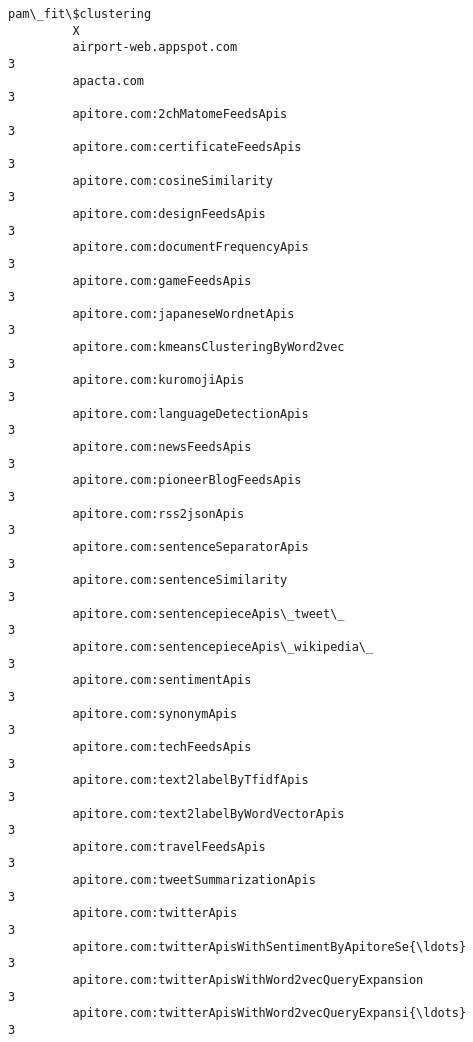 \documentclass[11pt]{article}
\begin{document}
\begin{Verbatim}[commandchars=\\\{\}]
                                                             pam\_fit\$clustering  
         X                                                                       
         airport-web.appspot.com                                              3  
         apacta.com                                                           3  
         apitore.com:2chMatomeFeedsApis                                       3  
         apitore.com:certificateFeedsApis                                     3  
         apitore.com:cosineSimilarity                                         3  
         apitore.com:designFeedsApis                                          3  
         apitore.com:documentFrequencyApis                                    3  
         apitore.com:gameFeedsApis                                            3  
         apitore.com:japaneseWordnetApis                                      3  
         apitore.com:kmeansClusteringByWord2vec                               3  
         apitore.com:kuromojiApis                                             3  
         apitore.com:languageDetectionApis                                    3  
         apitore.com:newsFeedsApis                                            3  
         apitore.com:pioneerBlogFeedsApis                                     3  
         apitore.com:rss2jsonApis                                             3  
         apitore.com:sentenceSeparatorApis                                    3  
         apitore.com:sentenceSimilarity                                       3  
         apitore.com:sentencepieceApis\_tweet\_                                 3  
         apitore.com:sentencepieceApis\_wikipedia\_                             3  
         apitore.com:sentimentApis                                            3  
         apitore.com:synonymApis                                              3  
         apitore.com:techFeedsApis                                            3  
         apitore.com:text2labelByTfidfApis                                    3  
         apitore.com:text2labelByWordVectorApis                               3  
         apitore.com:travelFeedsApis                                          3  
         apitore.com:tweetSummarizationApis                                   3  
         apitore.com:twitterApis                                              3  
         apitore.com:twitterApisWithSentimentByApitoreSe{\ldots}                   3  
         apitore.com:twitterApisWithWord2vecQueryExpansion                    3  
         apitore.com:twitterApisWithWord2vecQueryExpansi{\ldots}                   3  

\end{Verbatim}
\end{document}
